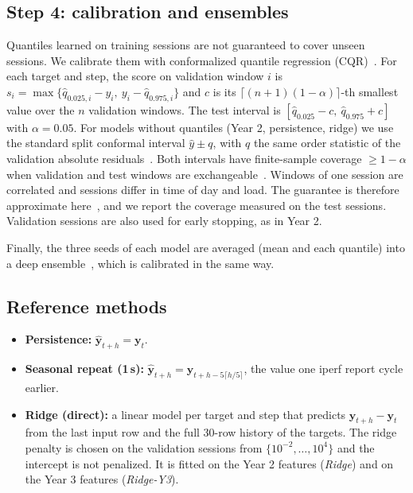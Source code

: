 \subsection{Step 4: calibration and ensembles}
Quantiles learned on training sessions are not guaranteed to cover unseen sessions. We calibrate them with conformalized quantile regression (CQR)~\cite{romano2019conformalized}. For each target and step, the score on validation window $i$ is $s_i=\max\{\hat{q}_{0.025,i}-y_i,\ y_i-\hat{q}_{0.975,i}\}$ and $c$ is its $\lceil (n+1)(1-\alpha)\rceil$-th smallest value over the $n$ validation windows. The test interval is $[\hat{q}_{0.025}-c,\ \hat{q}_{0.975}+c]$ with $\alpha=0.05$. For models without quantiles (Year 2, persistence, ridge) we use the standard split conformal interval $\hat{y}\pm q$, with $q$ the same order statistic of the validation absolute residuals~\cite{lei2018distribution}. Both intervals have finite-sample coverage $\geq 1-\alpha$ when validation and test windows are exchangeable~\cite{lei2018distribution}. Windows of one session are correlated and sessions differ in time of day and load. The guarantee is therefore approximate here~\cite{barber2023conformal}, and we report the coverage measured on the test sessions. Validation sessions are also used for early stopping, as in Year 2.

Finally, the three seeds of each model are averaged (mean and each quantile) into a deep ensemble~\cite{lakshminarayanan2017simple}, which is calibrated in the same way.

\subsection{Reference methods}
\begin{itemize}[leftmargin=*]
  \item \textbf{Persistence:} $\hat{\mathbf{y}}_{t+h}=\mathbf{y}_t$.
  \item \textbf{Seasonal repeat (1\,s):} $\hat{\mathbf{y}}_{t+h}=\mathbf{y}_{t+h-5\lceil h/5\rceil}$, the value one iperf report cycle earlier.
  \item \textbf{Ridge (direct):} a linear model per target and step that predicts $\mathbf{y}_{t+h}-\mathbf{y}_t$ from the last input row and the full 30-row history of the targets. The ridge penalty is chosen on the validation sessions from $\{10^{-2},\dots,10^{4}\}$ and the intercept is not penalized. It is fitted on the Year 2 features (\emph{Ridge}) and on the Year 3 features (\emph{Ridge-Y3}).
\end{itemize}
